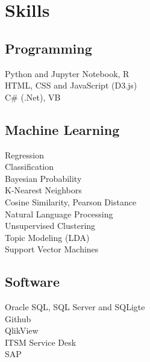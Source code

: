 \documentclass[letterpaper]{deedy-resume} %
\begin{document}
\begin{minipage}[t]{0.33\textwidth} %


\section{Skills}

\subsection{Programming}
Python and Jupyter Notebook, R \\
HTML, CSS and JavaScript (D3.js) \\
C\# (.Net), VB \\

\sectionspace %

\subsection{Machine Learning}
Regression \\
Classification\\
Bayesian Probability \\
K-Nearest Neighbors \\Cosine Similarity, Pearson Distance \\
Natural Language Processing \\
Unsupervised Clustering \\
Topic Modeling (LDA) \\
Support Vector Machines \\

\sectionspace %

\subsection{Software}
Oracle SQL, SQL Server and SQLigte \\
Github \\
QlikView \\
ITSM Service Desk \\
SAP \\


\sectionspace %



\end{minipage}
\end{document}
